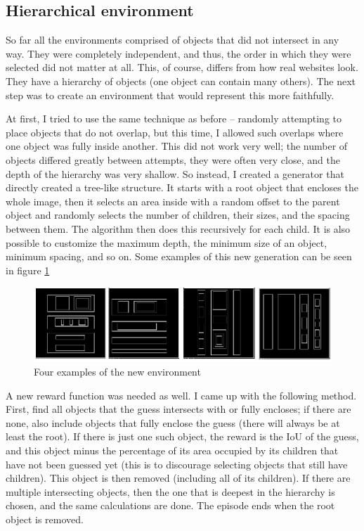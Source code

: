\documentclass[
  digital,     %
  oneside,     %
  nosansbold,  %
  nocolorbold, %
  lof,         %
  lot,         %
]{fithesis4}
\begin{document}
\subsection{Hierarchical environment}

So far all the environments comprised of objects that did not intersect in any way. They were completely independent, and thus, the order in which they were selected did not matter at all. This, of course, differs from how real websites look. They have a hierarchy of objects (one object can contain many others). The next step was to create an environment that would represent this more faithfully.

At first, I tried to use the same technique as before -- randomly attempting to place objects that do not overlap, but this time, I allowed such overlaps where one object was fully inside another. This did not work very well; the number of objects differed greatly between attempts, they were often very close, and the depth of the hierarchy was very shallow. So instead, I created a generator that directly created a tree-like structure. It starts with a root object that encloses the whole image, then it selects an area inside with a random offset to the parent object and randomly selects the number of children, their sizes, and the spacing between them. The algorithm then does this recursively for each child. It is also possible to customize the maximum depth, the minimum size of an object, minimum spacing, and so on. Some examples of this new generation can be seen in figure \ref{fig:env7}

\begin{figure}
    \centering
    \includegraphics[width=1\linewidth]{env_examples/env7.png}
    \caption{Four examples of the new environment}
    \label{fig:env7}
\end{figure}

A new reward function was needed as well. I came up with the following method. First, find all objects that the guess intersects with or fully encloses; if there are none, also include objects that fully enclose the guess (there will always be at least the root). If there is just one such object, the reward is the IoU of the guess, and this object minus the percentage of its area occupied by its children that have not been guessed yet (this is to discourage selecting objects that still have children). This object is then removed (including all of its children). If there are multiple intersecting objects, then the one that is deepest in the hierarchy is chosen, and the same calculations are done. The episode ends when the root object is removed.
\end{document}
